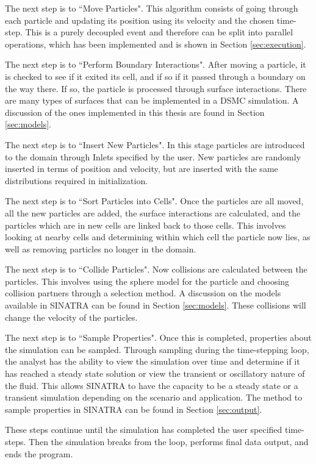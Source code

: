 The next step is to ``Move Particles". This algorithm consists of going through each particle and updating its position using its velocity and the chosen time-step. This is a purely decoupled event and therefore can be split into parallel operations, which has been implemented and is shown in Section \ref{sec:execution}. \par

The next step is to ``Perform Boundary Interactions". After moving a particle, it is checked to see if it exited its cell, and if so if it passed through a boundary on the way there. If so, the particle is processed through surface interactions. There are many types of surfaces that can be implemented in a DSMC simulation. A discussion of the ones implemented in this thesis are found in Section \ref{sec:models}. \par

The next step is to ``Insert New Particles". In this stage particles are introduced to the domain through Inlets specified by the user. New particles are randomly inserted in terms of position and velocity, but are inserted with the same distributions required in initialization. \par

The next step is to ``Sort Particles into Cells". Once the particles are all moved, all the new particles are added, the surface interactions are calculated, and the particles which are in new cells are linked back to those cells. This involves looking at nearby cells and determining within which cell the particle now lies, as well as removing particles no longer in the domain. \par

The next step is to ``Collide Particles". Now collisions are calculated between the particles. This involves using the sphere model for the particle and choosing collision partners through a selection method. A discussion on the models available in SINATRA can be found in Section \ref{sec:models}. These collisions will change the velocity of the particles. \par

The next step is to ``Sample Properties". Once this is completed, properties about the simulation can be sampled. Through sampling during the time-stepping loop, the analyst has the ability to view the simulation over time and determine if it has reached a steady state solution or view the transient or oscillatory nature of the fluid. This allows SINATRA to have the capacity to be a steady state or a transient simulation depending on the scenario and application. The method to sample properties in SINATRA can be found in Section \ref{sec:output}. \par

These steps continue until the simulation has completed the user specified time-steps. Then the simulation breaks from the loop, performs final data output, and ends the program. 




